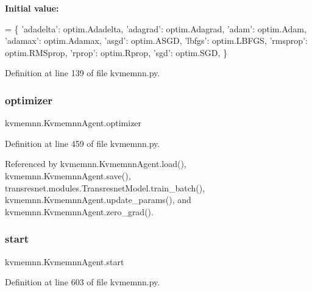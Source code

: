 {\bfseries Initial value\+:}
\begin{DoxyCode}
=  \{
        \textcolor{stringliteral}{'adadelta'}: optim.Adadelta,
        \textcolor{stringliteral}{'adagrad'}: optim.Adagrad,
        \textcolor{stringliteral}{'adam'}: optim.Adam,
        \textcolor{stringliteral}{'adamax'}: optim.Adamax,
        \textcolor{stringliteral}{'asgd'}: optim.ASGD,
        \textcolor{stringliteral}{'lbfgs'}: optim.LBFGS,
        \textcolor{stringliteral}{'rmsprop'}: optim.RMSprop,
        \textcolor{stringliteral}{'rprop'}: optim.Rprop,
        \textcolor{stringliteral}{'sgd'}: optim.SGD,
    \}
\end{DoxyCode}


Definition at line 139 of file kvmemnn.\+py.

\mbox{\label{classkvmemnn_1_1KvmemnnAgent_a2f5075b4d8503fe1fd0a230be9233a12}} 
\subsubsection{\texorpdfstring{optimizer}{optimizer}}
{\footnotesize\ttfamily kvmemnn.\+Kvmemnn\+Agent.\+optimizer}



Definition at line 459 of file kvmemnn.\+py.



Referenced by kvmemnn.\+Kvmemnn\+Agent.\+load(), kvmemnn.\+Kvmemnn\+Agent.\+save(), transresnet.\+modules.\+Transresnet\+Model.\+train\+\_\+batch(), kvmemnn.\+Kvmemnn\+Agent.\+update\+\_\+params(), and kvmemnn.\+Kvmemnn\+Agent.\+zero\+\_\+grad().

\mbox{\label{classkvmemnn_1_1KvmemnnAgent_a289b7cc75e8218d634de60309dce5dc0}} 
\subsubsection{\texorpdfstring{start}{start}}
{\footnotesize\ttfamily kvmemnn.\+Kvmemnn\+Agent.\+start}



Definition at line 603 of file kvmemnn.\+py.

